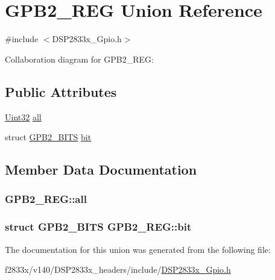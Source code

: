 \hypertarget{union_g_p_b2___r_e_g}{}\section{G\+P\+B2\+\_\+\+R\+E\+G Union Reference}
\label{union_g_p_b2___r_e_g}


{\ttfamily \#include $<$D\+S\+P2833x\+\_\+\+Gpio.\+h$>$}



Collaboration diagram for G\+P\+B2\+\_\+\+R\+E\+G\+:
\subsection*{Public Attributes}
\begin{DoxyCompactItemize}
\item 
\hyperlink{_d_s_p2833x___device_8h_aba99025e657f892beb7ff31cecf64653}{Uint32} \hyperlink{union_g_p_b2___r_e_g_ab212a6a145c3fa1ae243e12d20eae3a4}{all}
\item 
struct \hyperlink{struct_g_p_b2___b_i_t_s}{G\+P\+B2\+\_\+\+B\+I\+T\+S} \hyperlink{union_g_p_b2___r_e_g_a3713b41cdd5d167feb544384a73e1e13}{bit}
\end{DoxyCompactItemize}


\subsection{Member Data Documentation}
\hypertarget{union_g_p_b2___r_e_g_ab212a6a145c3fa1ae243e12d20eae3a4}{}
\subsubsection[{all}]{ G\+P\+B2\+\_\+\+R\+E\+G\+::all}\label{union_g_p_b2___r_e_g_ab212a6a145c3fa1ae243e12d20eae3a4}
\hypertarget{union_g_p_b2___r_e_g_a3713b41cdd5d167feb544384a73e1e13}{}
\subsubsection[{bit}]{\setlength{\rightskip}{0pt plus 5cm}struct {\bf G\+P\+B2\+\_\+\+B\+I\+T\+S} G\+P\+B2\+\_\+\+R\+E\+G\+::bit}\label{union_g_p_b2___r_e_g_a3713b41cdd5d167feb544384a73e1e13}


The documentation for this union was generated from the following file\+:\begin{DoxyCompactItemize}
\item 
f2833x/v140/\+D\+S\+P2833x\+\_\+headers/include/\hyperlink{_d_s_p2833x___gpio_8h}{D\+S\+P2833x\+\_\+\+Gpio.\+h}\end{DoxyCompactItemize}
